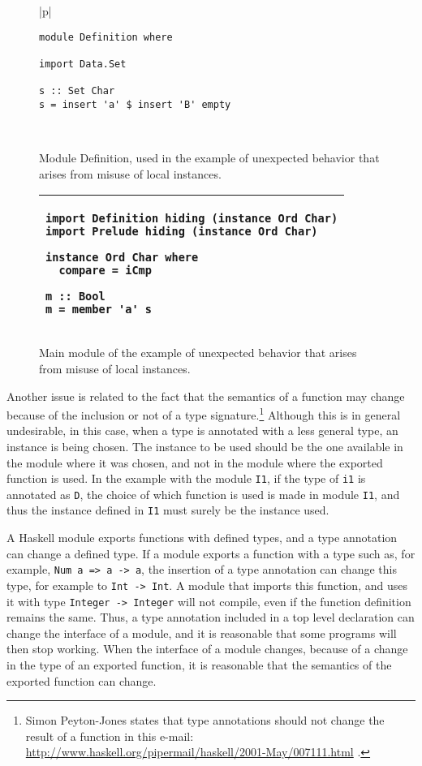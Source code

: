 \documentclass[msc]{ppgccufmg}
\begin{document}
{\begin{figure}
\caption{Module Definition, used in the example of unexpected behavior that
  arises from misuse of local instances.\label{definition}}
\begin{tabular}{|p{\textwidth}|}
\hline
\begin{verbatim}
module Definition where

import Data.Set

s :: Set Char
s = insert 'a' $ insert 'B' empty
\end{verbatim}
\\
\hline
\end{tabular}
\end{figure}

\begin{figure}
\caption{Main module of the example of unexpected behavior that arises from
  misuse of local instances.\label{main-set}}
\begin{tabular}{|p{\textwidth}|}
\hline
\begin{verbatim}
import Definition hiding (instance Ord Char)
import Prelude hiding (instance Ord Char)

instance Ord Char where
  compare = iCmp

m :: Bool
m = member 'a' s
\end{verbatim}
\vspace{-0.7cm}\\
\hline
\end{tabular}
\end{figure}

Another issue is related to the fact that the semantics of a function
may change because of the inclusion or not of a type
signature.\footnote{Simon Peyton-Jones states that type annotations
  should not change the result of a function in this e-mail:
  \url{http://www.haskell.org/pipermail/haskell/2001-May/007111.html}
  .} Although this is in general undesirable, in this case, when a
type is annotated with a less general type, an instance is being
chosen.  The instance to be used should be the one available in the
module where it was chosen, and not in the module where the exported
function is used. In the example with the module \texttt{I1}, if the
type of \texttt{i1} is annotated as \texttt{D}, the choice of which
function is used is made in module \texttt{I1}, and thus the instance
defined in \texttt{I1} must surely be the instance used.

A Haskell module exports functions with defined types, and a type
annotation can change a defined type. If a module exports a function
with a type such as, for example, \texttt{Num a => a -> a}, the
insertion of a type annotation can change this type, for example to
\texttt{Int -> Int}. A module that imports this function, and uses it
with type \texttt{Integer -> Integer} will not compile, even if the
function definition remains the same.  Thus, a type annotation
included in a top level declaration can change the interface of a
module, and it is reasonable that some programs will then stop
working.  When the interface of a module changes, because of a change
in the type of an exported function, it is reasonable that the
semantics of the exported function can change.

}
\end{document}
